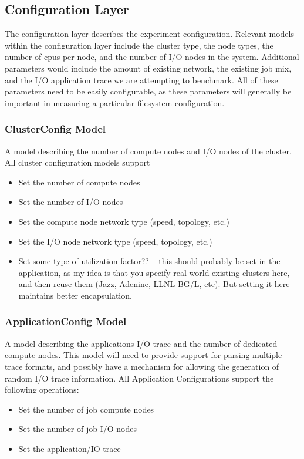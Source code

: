 \documentclass[11pt]{article}
\begin{document}
\subsection{Configuration Layer}
The configuration layer describes the experiment configuration.  Relevant
models within the configuration layer include the cluster type, the node
types, the number of cpus per node, and the number of I/O nodes in the system.
Additional parameters would include the amount of existing network, the
existing job mix, and the I/O application trace we are attempting to
benchmark.  All of these parameters need to be easily configurable, as these
parameters will generally be important in measuring a particular filesystem
configuration.

\subsubsection{ClusterConfig Model}
A model describing the number of compute nodes and I/O nodes of the cluster.
All cluster configuration models support 

\begin{itemize}
\item Set the number of compute nodes
\item Set the number of I/O nodes
\item Set the compute node network type (speed, topology, etc.)
\item Set the I/O node network type (speed, topology, etc.)
\item Set some type of utilization factor?? -- this should probably be set in
  the application, as my idea is that you specify real world existing clusters
  here, and then reuse them (Jazz, Adenine, LLNL BG/L, etc).  But setting it
  here maintains better encapsulation.
\end{itemize}

\subsubsection{ApplicationConfig Model}
A model describing the applications I/O trace and the number of dedicated
compute nodes.  This model will need to provide support for parsing multiple
trace formats, and possibly have a mechanism for allowing the generation of
random I/O trace information.  All Application Configurations support the
following operations:

\begin{itemize}
\item Set the number of job compute nodes
\item Set the number of job I/O nodes
\item Set the application/IO trace
\end{itemize}
\end{document}
